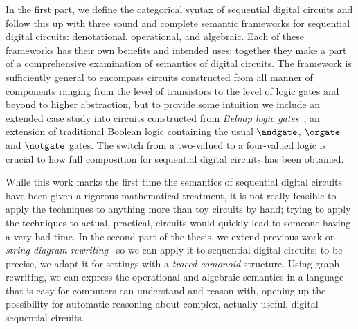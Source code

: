 In the first part, we define the categorical syntax of sequential digital
circuits and follow this up with three sound and complete semantic frameworks
for sequential digital circuits: denotational, operational, and algebraic.
Each of these frameworks has their own benefits and intended uses; together they
make a part of a comprehensive examination of semantics of digital circuits.
The framework is sufficiently general to encompass circuits constructed from
all manner of components ranging from the level of transistors to the level of
logic gates and beyond to higher abstraction, but to provide some intuition we
include an extended case study into circuits constructed from
\emph{Belnap logic gates}~\cite{belnap1977useful}, an extension of traditional
Boolean logic containing the usual \(\andgate\), \(\orgate\) and \(\notgate\)
gates.
The switch from a two-valued to a four-valued logic is crucial to how full
composition for sequential digital circuits has been obtained.

While this work marks the first time the semantics of sequential digital
circuits have been given a rigorous mathematical treatment, it is not really
feasible to apply the techniques to anything more than toy circuits by hand;
trying to apply the techniques to actual, practical, circuits would quickly lead
to someone having a very bad time.
In the second part of the thesis, we extend previous work on
\emph{string diagram rewriting}~\cite{bonchi2022string,bonchi2022stringa,bonchi2022stringb}
so we can apply it to sequential digital circuits; to be precise, we adapt it
for settings with a \emph{traced comonoid} structure.
Using graph rewriting, we can express the operational and algebraic semantics
in a language that is easy for computers can understand and reason with, opening
up the possibility for automatic reasoning about complex, actually useful,
digital sequential circuits.